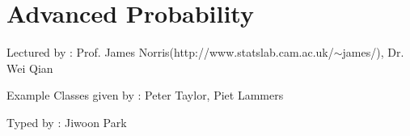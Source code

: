 \documentclass[12pt,a4paper]{report}
\DeclarePairedDelimiter\bignorm{\lVert}{\rVert}
\newcommand{\doublerule}[1][.4pt]{%
  \noindent
  \makebox[0pt][l]{\rule[.7ex]{\linewidth}{#1}}%
  \rule[.3ex]{\linewidth}{#1}}
\begin{document}


\newcommand{\thm}{\textbf{Theorem) }}
\newcommand{\thmnum}[1]{\textbf{Theorem #1) }}
\newcommand{\defi}{\textbf{Definition) }}
\newcommand{\definum}[1]{\textbf{Definition #1) }}
\newcommand{\lem}{\textbf{Lemma) }}
\newcommand{\lemnum}[1]{\textbf{Lemma #1) }}
\newcommand{\prop}{\textbf{Proposition)}}
\newcommand{\propnum}[1]{\textbf{Proposition #1) }}
\newcommand{\corr}{\textbf{Corollary) }}
\newcommand{\corrnum}[1]{\textbf{Corollary #1) }}
\newcommand{\pf}{\textbf{proof) }}


\newcommand{\lap}{\triangle} %
\newcommand{\s}{\vspace{10pt}}
\newcommand{\bull}{$\bullet$}
\newcommand{\sta}{$\star$}
\newcommand{\reals}{\mathbb{R}}

\newcommand{\eop}{\hfill  \textsl{(End of proof)} $\square$} %
\newcommand{\eos}{\hfill  \textsl{(End of statement)} $\square$} %


\newcommand{\intN}{\mathbb{Z}_N}
\newcommand{\nat}{\mathbb{N}}
\newcommand{\norms}[2]{\bignorm[\big]{#1}_{#2}}
\newcommand{\avg}{\mathbb{E}}
\newcommand{\prob}{\mathbb{P}}
\newcommand{\borel}{\mathscr{B}}
\newcommand{\EE}{\mathscr{E}}
\newcommand{\F}{\mathscr{F}}
\newcommand{\G}{\mathscr{F}}
\newcommand{\W}{\mathscr{W}}
\newcommand{\cov}{\text{Cov}}
\newcommand{\var}{\text{Var}}
\newcommand{\cha}{1}

\newcommand{\newday}{\doublerule[0.5pt]}

\setlength\parindent{0pt}

\chapter*{Advanced Probability}

Lectured by : Prof. James Norris(http://www.statslab.cam.ac.uk/$\sim$james/), Dr. Wei Qian

Example Classes given by : Peter Taylor, Piet Lammers
\s

Typed by : Jiwoon Park
\s
\end{document}
